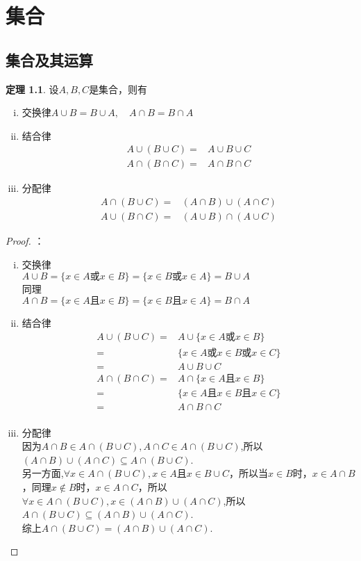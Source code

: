 \documentclass[oneside]{ctexbook}
\theoremstyle{definition} \newtheorem{defi}{定义}[section]
\theoremstyle{definition} \newtheorem{law}{定理}[section]
\theoremstyle{definition} \newtheorem{jury}{引理}[section]
\theoremstyle{remark} \newtheorem*{mar}{\heiti 推论}
\begin{document}
	\chapter{集合}
	\section{集合及其运算}
	\begin{law}
	设$A,B,C$是集合，则有
	\begin{enumerate}[(i)]
		\item 交换律$A\cup B=B\cup A,\quad A\cap B=B\cap A$
		\item 结合律
		\begin{align*}
		A\cup(B\cup C)=&A\cup B\cup C\\
		A\cap(B\cap C)=&A\cap B\cap C
		\end{align*}
		\item 分配律
		\begin{align*}
		A\cap(B\cup C)=&(A\cap B)\cup(A\cap C)\\
		A\cup(B\cap C)=&(A\cup B)\cap(A\cup C)
		\end{align*}
	\end{enumerate}
	\end{law}
    \begin{proof}
    	：
    	\begin{enumerate}[(i)]
    		\item 交换律\\
    		$A\cup B=\{x\in A\text{或}x\in B\}=\{x\in B\text{或}x\in A\}=B\cup A$\\
    		同理\\
    		$A\cap B=\{x\in A\text{且}x\in B\}=\{x\in B\text{且}x\in A\}=B\cap A$
    		\item 结合律
    		\begin{align*}
    		A\cup(B\cup C)=&A\cup \{x\in A\text{或}x\in B\}\\
    		              =&\{x\in A\text{或}x\in B\text{或}x\in C\}\\
    		              =&A\cup B\cup C\\
    		A\cap(B\cap C)=&A\cap \{x\in A\text{且}x\in B\}\\
    		              =&\{x\in A\text{且}x\in B\text{且}x\in C\}\\
    		              =&A\cap B\cap C\\
    		\end{align*}
    		\item 分配律\\
    		因为$A\cap B\in A\cap(B\cup C),A\cap C\in A\cap(B\cup C)$,所以$(A\cap B)\cup(A\cap C)\subseteq A\cap(B\cup C)$.\\
    		另一方面,$\forall x\in A\cap(B\cup C),x\in A\text{且}x\in B\cup C$，所以当$x\in B$时，$x\in A\cap B$，同理$x\notin B$时，$x\in A\cap C$，所以$\forall x\in A\cap(B\cup C),x\in (A\cap B)\cup(A\cap C)$,所以$A\cap(B\cup C)\subseteq (A\cap B)\cup(A\cap C)$.\\
    		综上$A\cap(B\cup C)=(A\cap B)\cup(A\cap C)$.
    	\end{enumerate}
    \end{proof}
\end{document}
